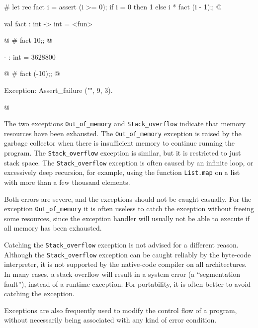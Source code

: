 \begin{ocaml}
# let rec fact i =
     assert (i >= 0);
     if i = 0 then
        1
     else
        i * fact (i - 1);;
@
\begin{topoutput}
val fact : int -> int = <fun>
\end{topoutput}
@
# fact 10;;
@
\begin{topoutput}
- : int = 3628800
\end{topoutput}
@
# fact (-10);;
@
\begin{topoutput}
Exception: Assert_failure ("", 9, 3).
\end{topoutput}
@
\end{ocaml}


The two exceptions \hbox{\lstinline/Out_of_memory/} and \hbox{\lstinline/Stack_overflow/} indicate that memory
resources have been exhausted.  The \hbox{\lstinline/Out_of_memory/} exception is raised by the garbage
collector when there is insufficient memory to continue running the program.
The \hbox{\lstinline/Stack_overflow/} exception is similar, but it is restricted to just stack space.  The
\hbox{\lstinline/Stack_overflow/} exception is often caused by an infinite loop, or excessively deep recursion, for
example, using the function \hbox{\lstinline/List.map/} on a list with more than a few thousand elements.

Both errors are severe, and the exceptions should not be caught casually.  For the
exception \hbox{\lstinline/Out_of_memory/} it is often useless to catch the exception without freeing some
resources, since the exception handler will usually not be able to execute if all memory has been
exhausted.

Catching the \hbox{\lstinline/Stack_overflow/} exception is not advised for a different reason.  Although the
\hbox{\lstinline/Stack_overflow/} exception can be caught reliably by the byte-code interpreter, it is not
supported by the native-code compiler on all architectures.  In many cases, a stack overflow will
result in a system error (a ``segmentation fault''), instead of a runtime exception.  For
portability, it is often better to avoid catching the exception.


Exceptions are also frequently used to modify the control flow of a program, without necessarily
being associated with any kind of error condition.


